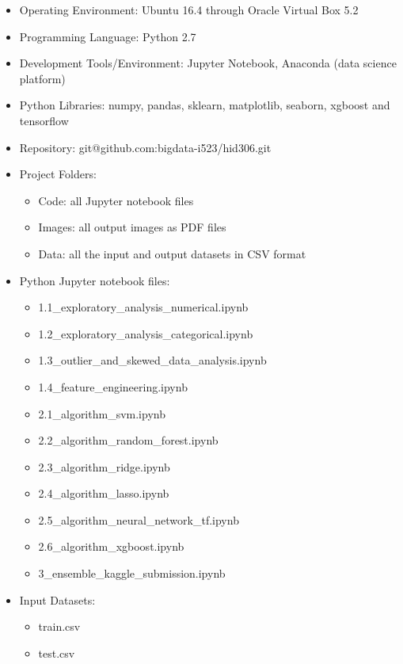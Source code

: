 \documentclass[sigconf]{acmart}
\begin{document}
    \begin{itemize}
    	\item Operating Environment: Ubuntu 16.4 through Oracle Virtual Box 5.2
    	\item Programming Language: Python 2.7
    	\item Development Tools/Environment: Jupyter Notebook, Anaconda (data science platform)
    	\item Python Libraries: numpy, pandas, sklearn, matplotlib, seaborn, xgboost and tensorflow
    	\item Repository: git@github.com:bigdata-i523/hid306.git
    	\item Project Folders:
   	    	\begin{itemize}
   	    		\item Code: all Jupyter notebook files
   	    		\item Images: all output images as PDF files
   	    		\item Data: all the input and output datasets in CSV format
   	    	\end{itemize}
    	\item Python Jupyter notebook files:
    	\begin{itemize}
    		\item 1.1\_exploratory\_analysis\_numerical.ipynb
    		\item 1.2\_exploratory\_analysis\_categorical.ipynb
	    	\item 1.3\_outlier\_and\_skewed\_data\_analysis.ipynb
	    	\item 1.4\_feature\_engineering.ipynb
	    	\item 2.1\_algorithm\_svm.ipynb
	    	\item 2.2\_algorithm\_random\_forest.ipynb
	    	\item 2.3\_algorithm\_ridge.ipynb
	    	\item 2.4\_algorithm\_lasso.ipynb
	    	\item 2.5\_algorithm\_neural\_network\_tf.ipynb
	    	\item 2.6\_algorithm\_xgboost.ipynb
	    	\item 3\_ensemble\_kaggle\_submission.ipynb	    	
    	\end{itemize}
        \item Input Datasets: 
        \begin{itemize}
        	\item train.csv
        	\item test.csv
        \end{itemize}  

\end{itemize}
\end{document}
